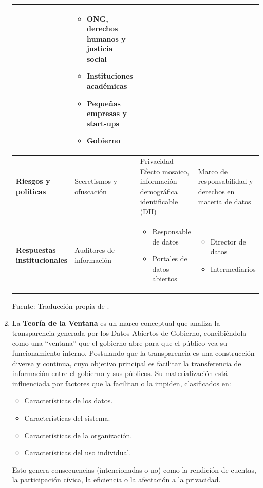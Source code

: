 \begin{enumerate}
\begin{table}[ht]
{\begin{tabular}{|p{3cm}|p{4cm}|p{4cm}|p{5cm}|}
				& 
				\begin{itemize}
					\item ONG, derechos humanos y justicia social
					\item Instituciones académicas
					\item Pequeñas empresas y start-ups
					\item Gobierno
				\end{itemize} \\
				\hline
				\textbf{Riesgos y políticas} & Secretismos y ofuscación & Privacidad -- Efecto mosaico, información demográfica identificable (DII) & Marco de responsabilidad y derechos en materia de datos \\
				\hline
				\textbf{Respuestas institucionales} & Auditores de información & 
				\begin{itemize}
					\item Responsable de datos
					\item Portales de datos abiertos
				\end{itemize}
				& 
				\begin{itemize}
					\item Director de datos
					\item Intermediarios
				\end{itemize} \\
				\hline
			\end{tabular}
		}
		\vspace{0.5em}
		
		\footnotesize Fuente: Traducción propia de \cite{verhulst2020}. \\
	\end{table}

	\item La \textbf{Teoría de la Ventana} \label{def6} \citep{Matheus03052020} es un marco conceptual que analiza la transparencia generada por los Datos Abiertos de Gobierno, concibiéndola como una ``ventana'' que el gobierno abre para que el público vea su funcionamiento interno. Postulando que la transparencia es una construcción diversa y continua, cuyo objetivo principal es facilitar la transferencia de información entre el gobierno y sus públicos. Su materialización está influenciada por factores que la facilitan o la impiden, clasificados en:
	\begin{itemize}
		\item Características de los datos.
		\item Características del sistema.
		\item Características de la organización.
		\item Características del uso individual.
	\end{itemize}
	Esto genera consecuencias (intencionadas o no) como la rendición de cuentas, la participación cívica, la eficiencia o la afectación a la privacidad. \\
	

\end{enumerate}
